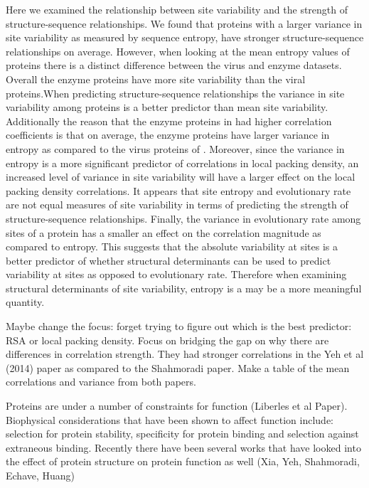 \documentclass[12pt]{article}
\begin{document}
\indent Here we examined the relationship between site variability and the strength of structure-sequence relationships. We found that proteins with a larger variance in site variability as measured by sequence entropy, have stronger structure-sequence relationships on average. However, when looking at the mean entropy values of proteins there is a distinct difference between the virus and enzyme datasets. Overall the enzyme proteins have more site variability than the viral proteins.When predicting structure-sequence relationships the variance in site variability among proteins is a better predictor than mean site variability.  Additionally the reason that the enzyme proteins in \cite{Yehetal2014} had higher correlation coefficients is that on average, the enzyme proteins have larger variance in entropy as compared to the virus proteins of \cite{Shahmoradietal2014}. Moreover, since the variance in entropy is a more significant predictor of correlations in local packing density, an increased level of variance in site variability will have a larger effect on the local packing density correlations. It appears that site entropy and evolutionary rate are not equal measures of site variability in terms of predicting the strength of structure-sequence relationships. Finally, the variance in evolutionary rate among sites of a protein has a smaller an effect on the correlation magnitude as compared to entropy. This suggests that the absolute variability at sites is a better predictor of whether structural determinants can be used to predict variability at sites  as opposed to evolutionary rate. Therefore when examining structural determinants of site variability, entropy is a may be a more meaningful quantity. 


Maybe change the focus: forget trying to figure out which is the best predictor: RSA or local packing density. Focus on bridging the gap on why there are differences in correlation strength. They had stronger correlations in the Yeh et al (2014) paper as compared to the Shahmoradi paper. Make a table of the mean correlations and variance from both papers. 

Proteins are under a number of constraints for function (Liberles et al Paper). Biophysical considerations that have been shown to affect function include: selection for protein stability, specificity for protein binding and selection against extraneous binding. Recently there have been several works that have looked into the effect of protein structure on protein function as well (Xia, Yeh, Shahmoradi, Echave, Huang)
\end{document}
